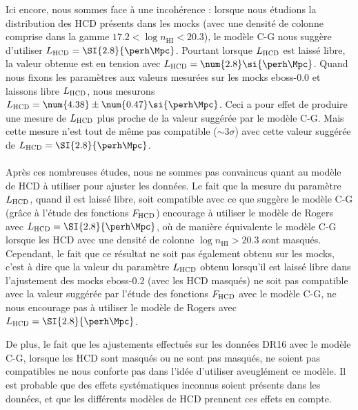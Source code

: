Ici encore, nous sommes face à une incohérence : lorsque nous étudions la distribution des HCD présents dans les mocks (avec une densité de colonne comprise dans la gamme $\num{17.2} < \log n_{\mathrm{HI}} < \num{20.3}$), le modèle C-G nous suggère d'utiliser $L_{\textsc{HCD}} = \SI{2.8}{\perh\Mpc}$. Pourtant lorsque $L_{\textsc{HCD}}$ est laissé libre, la valeur obtenue est en tension avec $L_{\textsc{HCD}} = \num{2.8} \si{\perh\Mpc}$.
Quand nous fixons les paramètres \lya{} aux valeurs mesurées sur les mocks eboss-0.0 et laissons libre $L_{\textsc{HCD}}$, nous mesurons $L_{\textsc{HCD}} = \num{4.38} \pm \num{0.47} \si{\perh\Mpc}$.
Ceci a pour effet de produire une mesure de $L_{\textsc{HCD}}$ plus proche de la valeur suggérée par le modèle C-G.
Mais cette mesure n'est tout de même pas compatible ($\sim 3 \sigma$) avec cette valeur suggérée de $L_{\textsc{HCD}} = \SI{2.8}{\perh\Mpc}$.


\paragraph{}
Après ces nombreuses études, nous ne sommes pas convaincus quant au modèle de HCD à utiliser pour ajuster les données.
Le fait que la mesure du paramètre $L_{\textsc{HCD}}$, quand il est laissé libre, soit compatible avec ce que suggère le modèle C-G (grâce à l'étude des fonctions $F_{\textsc{HCD}}$) encourage à utiliser le modèle de Rogers avec $L_{\textsc{HCD}} = \SI{2.8}{\perh\Mpc}$, où de manière équivalente le modèle C-G lorsque les HCD avec une densité de colonne $\log n_{\mathrm{HI}} > \num{20.3}$ sont masqués.
Cependant, le fait que ce résultat ne soit pas également obtenu sur les mocks, c'est à dire que la valeur du paramètre $L_{\textsc{HCD}}$ obtenu lorsqu'il est laissé libre dans l'ajustement des mocks eboss-0.2 (avec les HCD masqués) ne soit pas compatible avec la valeur suggérée par l'étude des fonctions $F_{\textsc{HCD}}$ avec le modèle C-G, ne nous encourage pas à utiliser le modèle de Rogers avec $L_{\textsc{HCD}} = \SI{2.8}{\perh\Mpc}$.

De plus, le fait que les ajustements effectués sur les données DR16 avec le modèle C-G, lorsque les HCD sont masqués ou ne sont pas masqués, ne soient pas compatibles ne nous conforte pas dans l'idée d'utiliser aveuglément ce modèle.
Il est probable que des effets systématiques inconnus soient présents dans les données, et que les différents modèles de HCD prennent ces effets en compte.

